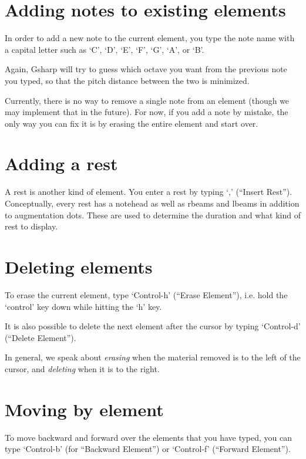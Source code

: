 \documentclass[11pt]{book}
\def\gs{Gsharp}
\def\kbd#1{`#1'}
\def\command#1{``#1''}
\begin{document}
\section{Adding notes to existing elements}

In order to add a new note to the current element, you type the note
name with a capital letter such as \kbd{C}, \kbd{D}, \kbd{E}, \kbd{F},
\kbd{G}, \kbd{A}, or \kbd{B}.

Again, {\gs} will try to guess which octave you want from the previous
note you typed, so that the pitch distance between the two is
minimized.

Currently, there is no way to remove a single note from an element
(though we may implement that in the future).  For now, if you add a
note by mistake, the only way you can fix it is by erasing the entire
element and start over. 

\section{Adding a rest}

A rest is another kind of element.  You enter a rest by typing \kbd{,}
(\command{Insert Rest}).  Conceptually, every rest has a notehead as
well as rbeams and lbeams in addition to augmentation dots.  These are
used to determine the duration and what kind of rest to display.

\section{Deleting elements}

To erase the current element, type \kbd{Control-h} (\command{Erase
Element}), i.e. hold the \kbd{control} key down while hitting the
\kbd{h} key.

It is also possible to delete the next element after the cursor by
typing \kbd{Control-d} (\command{Delete Element}). 

In general, we speak about \emph{erasing} when the
material removed is to the left of the cursor, and
\emph{deleting} when it is to the right. 

\section{Moving by element}

To move backward and forward over the elements that you have typed,
you can type \kbd{Control-b} (for \command{Backward Element}) or
\kbd{Control-f} (\command{Forward Element}). 
\end{document}
